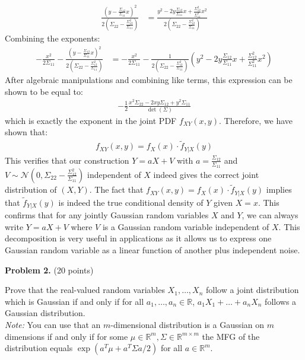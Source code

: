 \documentclass{article}
\begin{document}
\begin{enumerate}
{\begin{align}
\frac{(y-\frac{\Sigma_{12}}{\Sigma_{11}}x)^2}{2\left(\Sigma_{22} - \frac{\Sigma_{12}^2}{\Sigma_{11}}\right)} &= \frac{y^2 - 2y\frac{\Sigma_{12}}{\Sigma_{11}}x + \frac{\Sigma_{12}^2}{\Sigma_{11}^2}x^2}{2\left(\Sigma_{22} - \frac{\Sigma_{12}^2}{\Sigma_{11}}\right)}
\end{align}
Combining the exponents:
\begin{align}
-\frac{x^2}{2\Sigma_{11}} - \frac{(y-\frac{\Sigma_{12}}{\Sigma_{11}}x)^2}{2\left(\Sigma_{22} - \frac{\Sigma_{12}^2}{\Sigma_{11}}\right)} &= -\frac{x^2}{2\Sigma_{11}} - \frac{1}{2\left(\Sigma_{22} - \frac{\Sigma_{12}^2}{\Sigma_{11}}\right)}\left(y^2 - 2y\frac{\Sigma_{12}}{\Sigma_{11}}x + \frac{\Sigma_{12}^2}{\Sigma_{11}^2}x^2\right)
\end{align}
After algebraic manipulations and combining like terms, this expression can be shown to be equal to:
\begin{align}
-\frac{1}{2}\frac{x^2\Sigma_{22} - 2xy\Sigma_{12} + y^2\Sigma_{11}}{\det(\Sigma)}
\end{align}
which is exactly the exponent in the joint PDF $f_{XY}(x,y)$. 
Therefore, we have shown that:
\begin{align}
f_{XY}(x,y) = f_X(x) \cdot \tilde{f}_{Y|X}(y)
\end{align}
This verifies that our construction $Y = aX + V$ with $a = \frac{\Sigma_{12}}{\Sigma_{11}}$ and $V \sim \mathcal{N}\left(0, \Sigma_{22} - \frac{\Sigma_{12}^2}{\Sigma_{11}}\right)$ independent of $X$ indeed gives the correct joint distribution of $(X,Y)$.
The fact that $f_{XY}(x,y) = f_X(x) \cdot \tilde{f}_{Y|X}(y)$ implies that $\tilde{f}_{Y|X}(y)$ is indeed the true conditional density of $Y$ given $X=x$. This confirms that for any jointly Gaussian random variables $X$ and $Y$, we can always write $Y = aX + V$ where $V$ is a Gaussian random variable independent of $X$.
This decomposition is very useful in applications as it allows us to express one Gaussian random variable as a linear function of another plus independent noise.
    }

\end{enumerate}

\textbf{Problem 2.} (20 points)

Prove that the real-valued random variables $X_1, \dots, X_n$ follow
a joint distribution which is Gaussian if and only if for all $a_1,
\dots, a_n \in \mathbb{R}$, $a_1 X_1 + \dots + a_n X_n$ follows a
Gaussian distribution. \\
\textit{Note:} You can use that an $m$-dimensional distribution is a
Gaussian on $m$ dimensions if and only if for some $\mu \in
\mathbb{R}^m, \Sigma \in \mathbb{R}^{m \times m}$ the MFG of the
distribution equals $\exp\left( a^T \mu + a^T \Sigma a / 2 \right)$
for all $a \in \mathbb{R}^m$.
\end{document}
